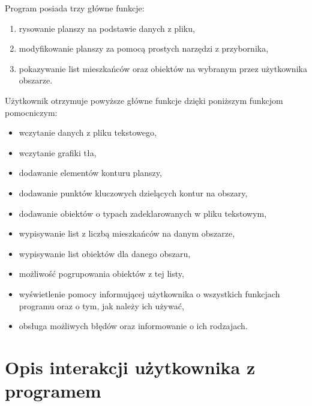 \documentclass[a4paper,12pt]{article}
\newcommand\tab[1][0.6cm]{\hspace*{#1} }
\begin{document}
\tab Program posiada trzy główne funkcje:
\begin{enumerate}
\item rysowanie planszy na podstawie danych z pliku,
\item modyfikowanie planszy za pomocą prostych narzędzi z przybornika,
\item pokazywanie list mieszkańców oraz obiektów na wybranym przez użytkownika obszarze.
\end{enumerate}
\tab Użytkownik otrzymuje powyższe główne funkcje dzięki poniższym funkcjom pomocniczym:
\begin{itemize}
\item wczytanie danych z pliku tekstowego,
\item wczytanie grafiki tła,
\item dodawanie elementów konturu planszy,
\item dodawanie punktów kluczowych dzielących kontur na obszary,
\item dodawanie obiektów o typach zadeklarowanych w pliku tekstowym,
\item wypisywanie list z liczbą mieszkańców na danym obszarze,
\item wypisywanie list obiektów dla danego obszaru,
\item możliwość pogrupowania obiektów z tej listy,
\item wyświetlenie pomocy informującej użytkownika o wszystkich funkcjach programu oraz o tym, jak należy ich używać,
\item obsługa możliwych błędów oraz informowanie o ich rodzajach.
\end{itemize}

\section{Opis interakcji użytkownika z programem}
\end{document}
